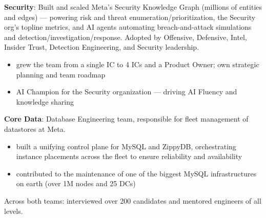 \begin{entrylist}
\vspace{-.4cm}

\textbf{\normalsize Security}: Built and scaled Meta's Security Knowledge Graph (millions of entities and edges) --- powering risk and threat enumeration/prioritization, the Security org's topline metrics, and AI agents automating breach-and-attack simulations and detection/investigation/response. Adopted by Offensive, Defensive, Intel, Insider Trust, Detection Engineering, and Security leadership.
\vspace{-.2cm}
\begin{itemize}[leftmargin=.6cm]
	\item grew the team from a single IC to 4 ICs and a Product Owner; own strategic planning and team roadmap
	\item AI Champion for the Security organization --- driving AI Fluency and knowledge sharing
\end{itemize}
\vspace{-.1cm}
\textbf{\normalsize Core Data}: Database Engineering team, responsible for fleet management of datastores at Meta.
\vspace{-.5cm}
\begin{itemize}[leftmargin=.6cm]
	\item built a unifying control plane for MySQL and ZippyDB, orchestrating instance placements across the fleet to ensure reliability and availability
	\item contributed to the maintenance of one of the biggest MySQL infrastructures on earth (over 1M nodes and 25 DCs)
\end{itemize}
\vspace{-.1cm}
Across both teams: interviewed over 200 candidates and mentored engineers of all levels.


\vspace{-.4cm}


\end{entrylist}

